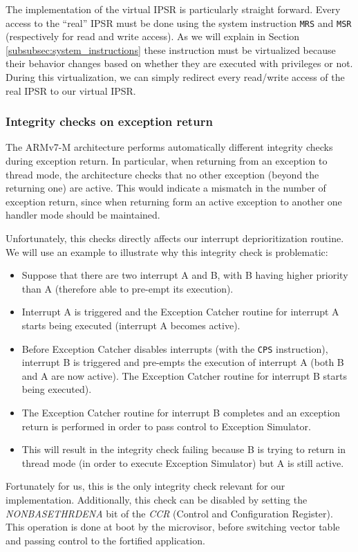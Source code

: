 \documentclass{article}
\begin{document}
The implementation of the virtual IPSR is particularly straight forward. Every access to the ``real'' IPSR must be done using the system instruction \verb|MRS| and \verb|MSR| (respectively for read and write access). As we will explain in Section \ref{subsubsec:system_instructions} these instruction must be virtualized because their behavior changes based on whether they are executed with privileges or not. During this virtualization, we can simply redirect every read/write access of the real IPSR to our virtual IPSR.

\subsubsection{Integrity checks on exception return}
The ARMv7-M architecture performs automatically different integrity checks during exception return. In particular, when returning from an exception to thread mode, the architecture checks that no other exception (beyond the returning one) are active. This would indicate a mismatch in the number of exception return, since when returning form an active exception to another one handler mode should be maintained.

Unfortunately, this checks directly affects our interrupt deprioritization routine. We will use an example to illustrate why this integrity check is problematic:
\begin{itemize}
	\item Suppose that there are two interrupt A and B, with B having higher priority than A (therefore able to pre-empt its execution).
	\item Interrupt A is triggered and the Exception Catcher routine for interrupt A starts being executed (interrupt A becomes active).
	\item Before Exception Catcher disables interrupts (with the \verb|CPS| instruction), interrupt B is triggered and pre-empts the execution of interrupt A (both B and A are now active). The Exception Catcher routine for interrupt B starts being executed).
	\item The Exception Catcher routine for interrupt B completes and an exception return is performed in order to pass control to Exception Simulator.
	\item This will result in the integrity check failing because B is trying to return in thread mode (in order to execute Exception Simulator) but A is still active.
\end{itemize}

Fortunately for us, this is the only integrity check relevant for our implementation. Additionally, this check can be disabled by setting the \textit{NONBASETHRDENA} bit of the \textit{CCR} (Control and Configuration Register). This operation is done at boot by the microvisor, before switching vector table and passing control to the fortified application.
\end{document}
